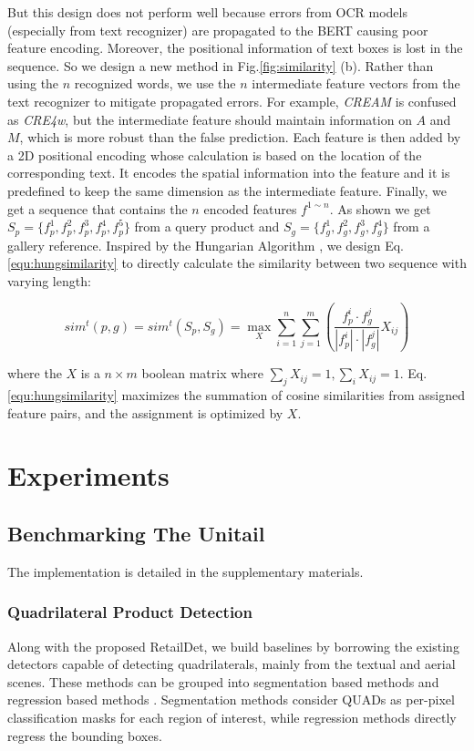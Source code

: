 \documentclass[runningheads]{llncs}
\begin{document}
But this design does not perform well because errors from OCR models (especially from text recognizer) are propagated to the BERT causing poor feature encoding. Moreover, the positional information of text boxes is lost in the sequence. So we design a new method in Fig.\ref{fig:similarity} (b). Rather than using the $n$ recognized words, we use the $n$ intermediate feature vectors from the text recognizer to mitigate propagated errors. For example, \textit{CREAM} is confused as \textit{CRE4w}, but the intermediate feature should maintain information on $A$ and $M$, which is more robust than the false prediction. Each feature is then added by a 2D positional encoding\cite{ImageTransformer,DETR} whose calculation is based on the location of the corresponding text. It encodes the spatial information into the feature and it is predefined to keep the same dimension as the intermediate feature. Finally, we get a sequence that contains the $n$ encoded features $f^{1\sim n}$. As shown we get $S_p = \{f^1_p,f^2_p,f^3_p,f^4_p, f^5_p\}$ from a query product and $S_g = \{f^1_g,f^2_g,f^3_g,f^4_g\}$ from a gallery reference. Inspired by the Hungarian Algorithm \cite{hungarian_algorithm}, we design Eq.\ref{equ:hungsimilarity} to directly calculate the similarity between two sequence with varying length:

\begin{equation} 
    sim^{t}(p, g) = sim^{t}(S_p, S_g) = \underset{X}{\operatorname{max}}\sum_{i=1}^{n}\sum_{j=1}^m (\frac{f_p^i \cdot f_g^j}{|f_p^i|\cdot |f_g^j|} X_{ij})
\label{equ:hungsimilarity}
\end{equation}

\noindent where the $X$ is a $n \times m$ boolean matrix where $\sum_{j}X_{ij} = 1, \sum_{i}X_{ij} = 1$. Eq.\ref{equ:hungsimilarity} maximizes the summation of cosine similarities from assigned feature pairs, and the assignment is optimized by $X$.

\section{Experiments}
\subsection{Benchmarking The Unitail}
The implementation is detailed in the supplementary materials.
\subsubsection{Quadrilateral Product Detection} 
Along with the proposed RetailDet, we build baselines by borrowing the existing detectors capable of detecting quadrilaterals, mainly from the textual and aerial scenes\cite{DOTA2021}. These methods can be grouped into segmentation based methods \cite{FCENet2021,PANet2019,PSENet2019,DBNet2020,he2017mask} and regression based methods \cite{RIDet,xu2019gliding,RSDet}. Segmentation methods consider QUADs as per-pixel classification masks for each region of interest, while regression methods directly regress the bounding boxes. 
\end{document}
